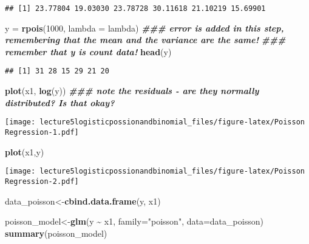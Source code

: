 \documentclass[
]{article}
\newenvironment{Shaded}{\begin{snugshade}}{\end{snugshade}}
\newcommand{\AttributeTok}[1]{\textcolor[rgb]{0.13,0.29,0.53}{#1}}
\newcommand{\DecValTok}[1]{\textcolor[rgb]{0.00,0.00,0.81}{#1}}
\newcommand{\DocumentationTok}[1]{\textcolor[rgb]{0.56,0.35,0.01}{\textbf{\textit{#1}}}}
\newcommand{\FunctionTok}[1]{\textcolor[rgb]{0.13,0.29,0.53}{\textbf{#1}}}
\newcommand{\NormalTok}[1]{#1}
\newcommand{\OtherTok}[1]{\textcolor[rgb]{0.56,0.35,0.01}{#1}}
\newcommand{\SpecialCharTok}[1]{\textcolor[rgb]{0.81,0.36,0.00}{\textbf{#1}}}
\newcommand{\StringTok}[1]{\textcolor[rgb]{0.31,0.60,0.02}{#1}}
\begin{document}
\begin{verbatim}
## [1] 23.77804 19.03030 23.78728 30.11618 21.10219 15.69901
\end{verbatim}

\begin{Shaded}
\begin{Highlighting}[]
\NormalTok{y }\OtherTok{=} \FunctionTok{rpois}\NormalTok{(}\DecValTok{1000}\NormalTok{, }\AttributeTok{lambda =}\NormalTok{ lambda) }\DocumentationTok{\#\#\# error is added in this step, remembering that the mean and the variance are the same!}
\DocumentationTok{\#\#\# remember that y is count data!}
\FunctionTok{head}\NormalTok{(y)}
\end{Highlighting}
\end{Shaded}

\begin{verbatim}
## [1] 31 28 15 29 21 20
\end{verbatim}

\begin{Shaded}
\begin{Highlighting}[]
\FunctionTok{plot}\NormalTok{(x1, }\FunctionTok{log}\NormalTok{(y)) }\DocumentationTok{\#\#\# note the residuals {-} are they normally distributed? Is that okay?}
\end{Highlighting}
\end{Shaded}

\texttt{[image: lecture5logisticpossionandbinomial\_files/figure-latex/Poisson Regression-1.pdf]}

\begin{Shaded}
\begin{Highlighting}[]
\FunctionTok{plot}\NormalTok{(x1,y)}
\end{Highlighting}
\end{Shaded}

\texttt{[image: lecture5logisticpossionandbinomial\_files/figure-latex/Poisson Regression-2.pdf]}

\begin{Shaded}
\begin{Highlighting}[]
\NormalTok{data\_poisson}\OtherTok{\textless{}{-}}\FunctionTok{cbind.data.frame}\NormalTok{(y, x1)}

\NormalTok{poisson\_model}\OtherTok{\textless{}{-}}\FunctionTok{glm}\NormalTok{(y }\SpecialCharTok{\textasciitilde{}}\NormalTok{ x1, }\AttributeTok{family=}\StringTok{"poisson"}\NormalTok{, }\AttributeTok{data=}\NormalTok{data\_poisson)}
\FunctionTok{summary}\NormalTok{(poisson\_model)}
\end{Highlighting}
\end{Shaded}
\end{document}
